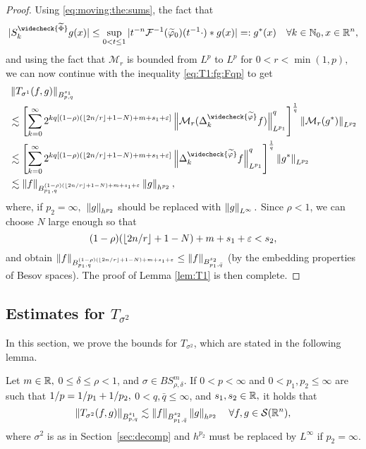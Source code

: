 \begin{proof}
Using  \eqref{eq:moving:the:sums},  the fact that  
\begin{equation}\label{def:g*}
|S^{\widecheck{\widetilde{\Phi}}}_k g(x)| \leq \sup\limits_{0 < t \le 1} |t^{-n}\mathcal{F}^{-1}(\widetilde{\f}_0)(t^{-1} \cdot)* g(x)| =: g^*(x) \quad \forall k \in \naz,  x \in \rn, 
\end{equation}
and using the fact that $\mathcal{M}_r$ is bounded from $L^p$ to $L^p$ for $0<r < \min(1,p),$ we can now continue with the inequality \eqref{eq:T1:fg:Fqp} to get
\begin{align*}
& \norm{T_{\sigma^1}(f,g)}{\ibes{p}{s_1}{q}}\\
&  \lesssim   \left[  \sum\limits_{k=0}^\infty   2^{k q [(1-\rho)( \lfloor{2n/r}\rfloor + 1-N) + m+s_1+\eps]}  \norm{ \mathcal{M}_r(\Delta^{\widecheck{\widetilde{\f}}}_k f)}{L^{p_1}}^q \right]^\frac{1}{q} \norm{\mathcal{M}_r(g^*)}{L^{p_2}}\\
&  \lesssim   \left[  \sum\limits_{k=0}^\infty   2^{k q [(1-\rho)( \lfloor{2n/r}\rfloor + 1-N) + m+s_1+\eps]}   \norm{\Delta^{\widecheck{\widetilde{\f}}}_k f}{L^{p_1}}^q \right]^\frac{1}{q} \norm{g^*}{L^{p_2}}\\
& \lesssim \norm{f}{\ibes{p_1}{(1-\rho)( \lfloor{2n/r}\rfloor + 1-N) + m + s_1+\eps }{q}}  \norm{ g}{h^{p_2}},
\end{align*}
 where, if $p_2=\infty,$  $\norm{g}{h^{p_2}}$ should be replaced with $\norm{g}{L^\infty}.$ Since $\rho<1$, we can choose $N$ large enough so that
$$
(1-\rho)( \lfloor{2n/r}\rfloor + 1-N) + m +s_1 +\eps  < s_2,
$$
and obtain $ \norm{f}{\ibes{p_1}{(1-\rho)( \lfloor{2n/r}\rfloor + 1-N) + m +s_1+ \eps }{q}} \leq  \norm{f}{\ibes{p_1}{s_2}{\bar{q}}}$ (by the embedding properties of Besov spaces). The proof of Lemma \ref{lem:T1} is then complete.

\end{proof}

\subsection{Estimates for $T_{\sigma^2}$}\label{sec:T2}

In this section, we prove the bounds for $T_{\sigma^2}$, which are stated in the following lemma.

\begin{lemma}\label{lem:T2} 
Let $m \in \re,$ $0 \le \delta\le \rho < 1$, and $\sigma \in BS^m_{\rho, \delta}$. If $0<p<\infty$ and $0< p_1, p_2 \le \infty$ are such that $\hcline,$ $0 < q,\bar{q} \leq \infty$, and $s_1, s_2 \in \re,$ it holds that
\begin{equation}\label{eq:T2}
\norm{T_{\sigma^2}(f,g)}{\ibes{p}{s_1}{q}}  \lesssim \norm{f}{\ibes{p_1}{s_2}{\bar{q}}} \norm{g}{h^{p_2}} \quad \forall f, g \in \sw,
\end{equation}
where $\sigma^2$ is as in Section~\ref{sec:decomp} and $h^{p_2}$ must be replaced by $L^\infty$ if $p_2=\infty.$
\end{lemma}

